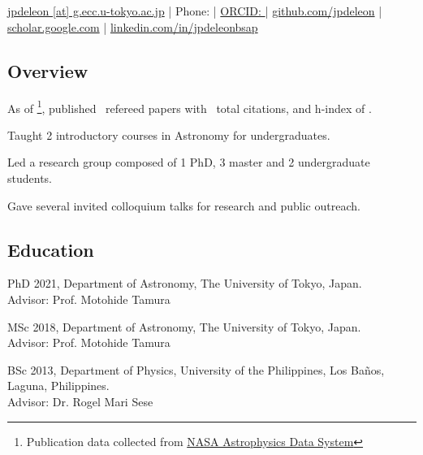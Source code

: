 \documentclass[12pt,letterpaper]{article}
\begin{document}
\thispagestyle{empty}\sloppy\sloppypar\raggedbottom

\textbf{\Large \fullname} \\[0.5ex]
\currentposition \\
\textsf{\small 
    \href{mailto:\email}{jpdeleon [at] g.ecc.u-tokyo.ac.jp} | %
    Phone: {\phonenumber} | %
    \href{\orcidurl}{ORCID: \orcid} | %
    \href{\githuburl}{github.com/jpdeleon} | %
    \href{\scholarurl}{scholar.google.com} | %
    \href{\linkedinurl}{linkedin.com/in/jpdeleonbsap}
}\\[0.5ex]

\subsection{Overview}
\begin{list}{}{\cvlist}
      \item As of \pubsdate\footnote{Publication data collected from \href{https://ui.adsabs.harvard.edu/}{NASA Astrophysics Data System}}, published \pubsnumber\ refereed papers with \pubscitations\ total citations, and h-index of \pubshindex.
      \item Taught 2 introductory courses in Astronomy for undergraduates. 
      \item Led a research group composed of 1 PhD, 3 master and 2 undergraduate students. 
      \item Gave several invited colloquium talks for research and public outreach.
\end{list}

\subsection{Education}
\begin{list}{}{\cvlist}
    \item
          PhD 2021, Department of Astronomy, The University of Tokyo, Japan.\\Advisor: Prof. Motohide Tamura
    \item
          MSc 2018, Department of Astronomy, The University of Tokyo, Japan.\\Advisor: Prof. Motohide Tamura
    \item
          BSc 2013, Department of Physics, University of the Philippines, Los Ba\~nos, Laguna, Philippines.\\Advisor: Dr. Rogel Mari Sese      
\end{list}
\end{document}
